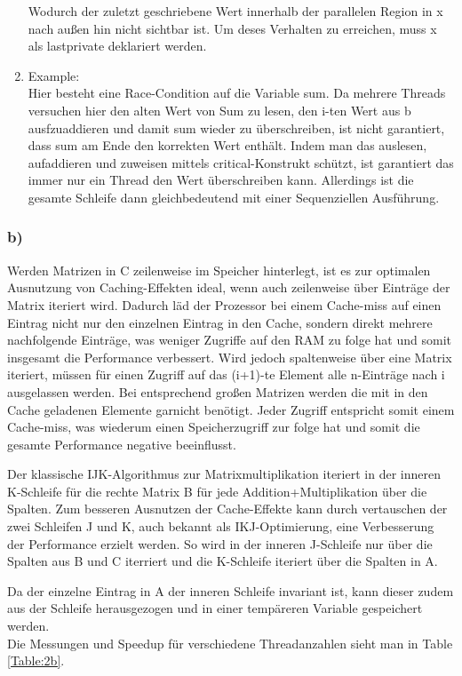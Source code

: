 \documentclass{report}
\begin{document}
\begin{enumerate}
				Wodurch der zuletzt geschriebene Wert innerhalb der parallelen Region in x nach außen hin nicht sichtbar ist.
				Um deses Verhalten zu erreichen, muss x als lastprivate deklariert werden.
			\item Example: \\
				Hier besteht eine Race-Condition auf die Variable sum. 
				Da mehrere Threads versuchen hier den alten Wert von Sum zu lesen, den i-ten Wert aus b ausfzuaddieren und damit sum wieder zu überschreiben, ist nicht garantiert, dass sum am Ende den korrekten Wert enthält.
				Indem man das auslesen, aufaddieren und zuweisen mittels critical-Konstrukt schützt, ist garantiert das immer nur ein Thread den Wert überschreiben kann.
				Allerdings ist die gesamte Schleife dann gleichbedeutend mit einer Sequenziellen Ausführung.
		\end{enumerate}

		\subsubsection{b)}
			Werden Matrizen in C zeilenweise im Speicher hinterlegt, ist es zur optimalen Ausnutzung von Caching-Effekten ideal, wenn auch zeilenweise über Einträge der Matrix iteriert wird.
			Dadurch läd der Prozessor bei einem Cache-miss auf einen Eintrag nicht nur den einzelnen Eintrag in den Cache, sondern direkt mehrere nachfolgende Einträge, was weniger Zugriffe auf den RAM zu folge hat und somit insgesamt die Performance verbessert.
			Wird jedoch spaltenweise über eine Matrix iteriert, müssen für einen Zugriff auf das (i+1)-te Element alle n-Einträge nach i ausgelassen werden. 
			Bei entsprechend großen Matrizen werden die mit in den Cache geladenen Elemente garnicht benötigt.
			Jeder Zugriff entspricht somit einem Cache-miss, was wiederum einen Speicherzugriff zur folge hat und somit die gesamte Performance negative beeinflusst.
			
			Der klassische IJK-Algorithmus zur Matrixmultiplikation iteriert in der inneren K-Schleife für die rechte Matrix B für jede Addition+Multiplikation über die Spalten.
			Zum besseren Ausnutzen der Cache-Effekte kann durch vertauschen der zwei Schleifen J und K, auch bekannt als IKJ-Optimierung, eine Verbesserung der Performance erzielt werden.
			So wird in der inneren J-Schleife nur über die Spalten aus B und C iterriert und die K-Schleife iteriert über die Spalten in A.

			Da der einzelne Eintrag in A der inneren Schleife invariant ist, kann dieser zudem aus der Schleife herausgezogen und in einer tempäreren Variable gespeichert werden. \\
			Die Messungen und Speedup für verschiedene Threadanzahlen sieht man in Table \ref{Table:2b}.
\end{document}
